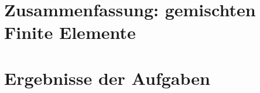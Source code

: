 \documentclass[12pt,a4paper]{scrartcl}
\numberwithin{equation}{section}
\begin{document}


\tableofcontents

\section{Zusammenfassung: gemischten Finite Elemente}

\section{Ergebnisse der Aufgaben}

\end{document}
